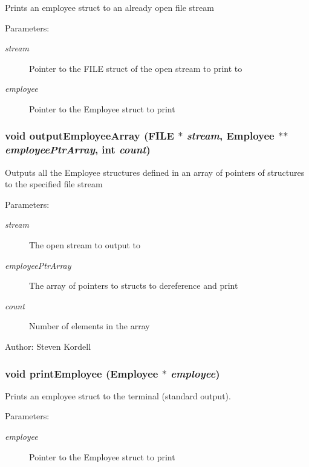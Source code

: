 Prints an employee struct to an already open file stream \begin{Desc}
\item[Parameters:]
\begin{description}
\item[{\em stream}]Pointer to the FILE struct of the open stream to print to \item[{\em employee}]Pointer to the Employee struct to print \end{description}
\end{Desc}
\subsubsection{\setlength{\rightskip}{0pt plus 5cm}void output\-Employee\-Array (FILE $\ast$ {\em stream}, \bf{Employee} $\ast$$\ast$ {\em employee\-Ptr\-Array}, int {\em count})}\label{employeef_8c_63d15476d6b50d78ee285183938d091b}


Outputs all the Employee structures defined in an array of pointers of structures to the specified file stream \begin{Desc}
\item[Parameters:]
\begin{description}
\item[{\em stream}]The open stream to output to \item[{\em employee\-Ptr\-Array}]The array of pointers to structs to dereference and print \item[{\em count}]Number of elements in the array \end{description}
\end{Desc}
\begin{Desc}
\item[Author:]Steven Kordell \end{Desc}
\subsubsection{\setlength{\rightskip}{0pt plus 5cm}void print\-Employee (\bf{Employee} $\ast$ {\em employee})}\label{employeef_8c_291560c311b426d2ea7f359bfc45ed5f}


Prints an employee struct to the terminal (standard output). \begin{Desc}
\item[Parameters:]
\begin{description}
\item[{\em employee}]Pointer to the Employee struct to print \end{description}
\end{Desc}
